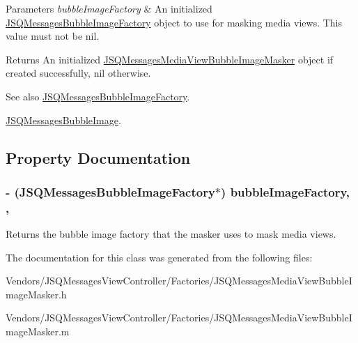 \begin{DoxyParams}{Parameters}
{\em bubble\+Image\+Factory} & An initialized {\ttfamily \hyperlink{interface_j_s_q_messages_bubble_image_factory}{J\+S\+Q\+Messages\+Bubble\+Image\+Factory}} object to use for masking media views. This value must not be {\ttfamily nil}.\\
\hline
\end{DoxyParams}
\begin{DoxyReturn}{Returns}
An initialized {\ttfamily \hyperlink{interface_j_s_q_messages_media_view_bubble_image_masker}{J\+S\+Q\+Messages\+Media\+View\+Bubble\+Image\+Masker}} object if created successfully, {\ttfamily nil} otherwise.
\end{DoxyReturn}
\begin{DoxySeeAlso}{See also}
\hyperlink{interface_j_s_q_messages_bubble_image_factory}{J\+S\+Q\+Messages\+Bubble\+Image\+Factory}. 

\hyperlink{interface_j_s_q_messages_bubble_image}{J\+S\+Q\+Messages\+Bubble\+Image}. 
\end{DoxySeeAlso}


\subsection{Property Documentation}
\hypertarget{interface_j_s_q_messages_media_view_bubble_image_masker_ae239715160deab2cc19ab9bfa7ae2db5}{}
\subsubsection[{bubble\+Image\+Factory}]{\setlength{\rightskip}{0pt plus 5cm}-\/ ({\bf J\+S\+Q\+Messages\+Bubble\+Image\+Factory}$\ast$) bubble\+Image\+Factory\hspace{0.3cm}{\ttfamily [read]}, {\ttfamily [nonatomic]}, {\ttfamily [strong]}}\label{interface_j_s_q_messages_media_view_bubble_image_masker_ae239715160deab2cc19ab9bfa7ae2db5}
Returns the bubble image factory that the masker uses to mask media views. 

The documentation for this class was generated from the following files\+:\begin{DoxyCompactItemize}
\item 
Vendors/\+J\+S\+Q\+Messages\+View\+Controller/\+Factories/J\+S\+Q\+Messages\+Media\+View\+Bubble\+Image\+Masker.\+h\item 
Vendors/\+J\+S\+Q\+Messages\+View\+Controller/\+Factories/J\+S\+Q\+Messages\+Media\+View\+Bubble\+Image\+Masker.\+m\end{DoxyCompactItemize}
